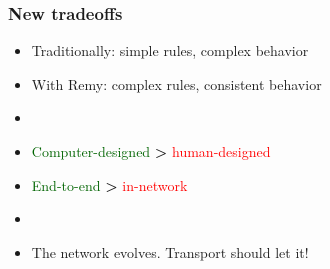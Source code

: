 \documentclass[svgnames]{beamer}
\begin{document}
\begin{frame}
\frametitle{New tradeoffs}

\large

\begin{itemize}

\item Traditionally: simple rules, complex behavior

\item With Remy: complex rules, consistent behavior

\item[]

\item \textcolor{DarkGreen}{Computer-designed} {\LARGE \textbf{\textgreater}} \textcolor{Red}{human-designed}

\item \textcolor{DarkGreen}{End-to-end} {\LARGE \textbf{\textgreater}} \textcolor{Red}{in-network}

\item[]

\item The network evolves. Transport should let it!

\end{itemize}

\end{frame}
\end{document}
